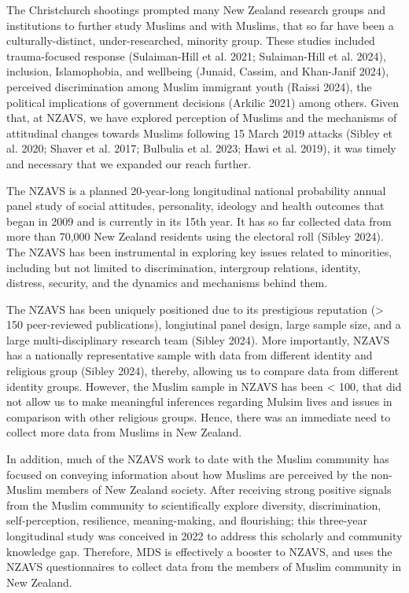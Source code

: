 \documentclass[
]{interact}
\begin{document}
The Christchurch shootings prompted many New Zealand research groups and
institutions to further study Muslims and with Muslims, that so far have
been a culturally-distinct, under-researched, minority group. These
studies included trauma-focused response (Sulaiman-Hill et al. 2021;
Sulaiman-Hill et al. 2024), inclusion, Islamophobia, and wellbeing
(Junaid, Cassim, and Khan-Janif 2024), perceived discrimination among
Muslim immigrant youth (Raissi 2024), the political implications of
government decisions (Arkilic 2021) among others. Given that, at NZAVS,
we have explored perception of Muslims and the mechanisms of attitudinal
changes towards Muslims following 15 March 2019 attacks (Sibley et al.
2020; Shaver et al. 2017; Bulbulia et al. 2023; Hawi et al. 2019), it
was timely and necessary that we expanded our reach further.

The NZAVS is a planned 20-year-long longitudinal national probability
annual panel study of social attitudes, personality, ideology and health
outcomes that began in 2009 and is currently in its 15th year. It has so
far collected data from more than 70,000 New Zealand residents using the
electoral roll (Sibley 2024). The NZAVS has been instrumental in
exploring key issues related to minorities, including but not limited to
discrimination, intergroup relations, identity, distress, security, and
the dynamics and mechanisms behind them.

The NZAVS has been uniquely positioned due to its prestigious reputation
(\textgreater{} 150 peer-reviewed publications), longiutinal panel
design, large sample size, and a large multi-disciplinary research team
(Sibley 2024). More importantly, NZAVS has a nationally representative
sample with data from different identity and religious group (Sibley
2024), thereby, allowing us to compare data from different identity
groups. However, the Muslim sample in NZAVS has been \textless{} 100,
that did not allow us to make meaningful inferences regarding Mulsim
lives and issues in comparison with other religious groups. Hence, there
was an immediate need to collect more data from Muslims in New Zealand.

In addition, much of the NZAVS work to date with the Muslim community
has focused on conveying information about how Muslims are perceived by
the non-Muslim members of New Zealand society. After receiving strong
positive signals from the Muslim community to scientifically explore
diversity, discrimination, self-perception, resilience, meaning-making,
and flourishing; this three-year longitudinal study was conceived in
2022 to address this scholarly and community knowledge gap. Therefore,
MDS is effectively a booster to NZAVS, and uses the NZAVS questionnaires
to collect data from the members of Muslim community in New Zealand.
\end{document}
